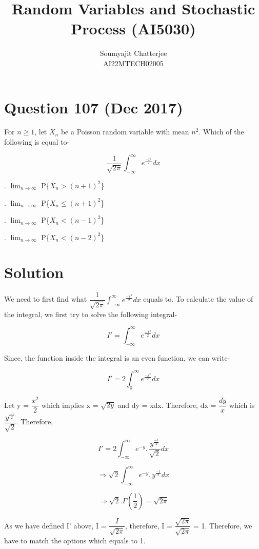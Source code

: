 \documentclass[12pt]{article}
\title{Random Variables and Stochastic Process (AI5030)}
\author{Soumyajit Chatterjee\\AI22MTECH02005 }
\begin{document}
\maketitle

\section*{Question 107 (Dec 2017)}
For $n \geq 1$, let $X_n$ be a Poisson random variable with mean $n^2$. Which of the following is equal to-

$$
\dfrac{1}{\sqrt{2 \pi}} \int_{- \infty}^{\infty} e^{\frac{-x^2}{2}} dx
$$

. $\lim_{n \to \infty}$ P\{$X_n > (n+1)^2$\}

. $\lim_{n \to \infty}$ P\{$X_n \leq (n+1)^2$\}

. $\lim_{n \to \infty}$ P\{$X_n < (n-1)^2$\}

. $\lim_{n \to \infty}$ P\{$X_n < (n-2)^2$\}

\section*{Solution}
We need to first find what $\dfrac{1}{\sqrt{2 \pi}} \int_{- \infty}^{\infty} e^{\frac{-x^2}{2}} dx$ equals to. To calculate the value of the integral, we first try to solve the following integral-

$$
I' = \int_{- \infty}^{\infty} e^{\frac{-x^2}{2}} dx
$$

\noindent Since, the function inside the integral is an even function, we can write-

$$
I' = 2 \int_{0}^{\infty} e^{\frac{-x^2}{2}} dx
$$

\noindent Let y = $\dfrac{x^2}{2}$ which implies x = $\sqrt{2y}$ and dy = xdx. Therefore, dx = $\dfrac{dy}{x}$ which is $\dfrac{y^{\frac{-1}{2}}}{\sqrt{2}}$. Therefore, 

$$
I' = 2 \int_{- \infty}^{\infty} e^{-y} .\, \dfrac{y^{\frac{-1}{2}}}{\sqrt{2}} dx
$$

$$
\Rightarrow \sqrt{2} \int_{- \infty}^{\infty} e^{-y} .\, y^{\frac{-1}{2}} dx
$$

$$
\Rightarrow \sqrt{2}. \Gamma (\dfrac{1}{2}) = \sqrt{2 \pi}
$$

\noindent As we have defined I' above, I = $\dfrac{I}{\sqrt{2 \pi}}$, therefore, I = $\dfrac{\sqrt{2 \pi}}{\sqrt{2 \pi}}$ = 1. Therefore, we have to match the options which equals to 1.\\
\end{document}
